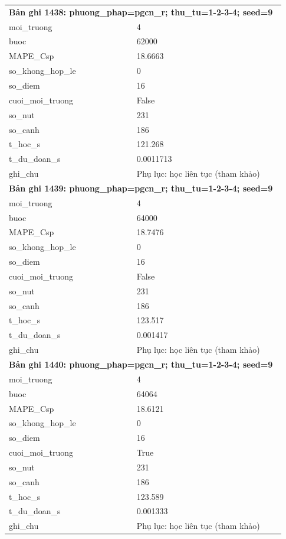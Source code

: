 \begin{longtable}{p{0.43\linewidth}p{0.50\linewidth}}
\midrule
\multicolumn{2}{p{0.95\linewidth}}{\textbf{Bản ghi 1438: phuong\_phap=pgcn\_r; thu\_tu=1-2-3-4; seed=9}} \\
moi\_\allowbreak truong & 4 \\
buoc & 62000 \\
MAPE\_\allowbreak Csp & 18.6663 \\
so\_\allowbreak khong\_\allowbreak hop\_\allowbreak le & 0 \\
so\_\allowbreak diem & 16 \\
cuoi\_\allowbreak moi\_\allowbreak truong & False \\
so\_\allowbreak nut & 231 \\
so\_\allowbreak canh & 186 \\
t\_\allowbreak hoc\_\allowbreak s & 121.268 \\
t\_\allowbreak du\_\allowbreak doan\_\allowbreak s & 0.0011713 \\
ghi\_\allowbreak chu & Phụ lục: học liên tục (tham khảo) \\
\midrule
\multicolumn{2}{p{0.95\linewidth}}{\textbf{Bản ghi 1439: phuong\_phap=pgcn\_r; thu\_tu=1-2-3-4; seed=9}} \\
moi\_\allowbreak truong & 4 \\
buoc & 64000 \\
MAPE\_\allowbreak Csp & 18.7476 \\
so\_\allowbreak khong\_\allowbreak hop\_\allowbreak le & 0 \\
so\_\allowbreak diem & 16 \\
cuoi\_\allowbreak moi\_\allowbreak truong & False \\
so\_\allowbreak nut & 231 \\
so\_\allowbreak canh & 186 \\
t\_\allowbreak hoc\_\allowbreak s & 123.517 \\
t\_\allowbreak du\_\allowbreak doan\_\allowbreak s & 0.001417 \\
ghi\_\allowbreak chu & Phụ lục: học liên tục (tham khảo) \\
\midrule
\multicolumn{2}{p{0.95\linewidth}}{\textbf{Bản ghi 1440: phuong\_phap=pgcn\_r; thu\_tu=1-2-3-4; seed=9}} \\
moi\_\allowbreak truong & 4 \\
buoc & 64064 \\
MAPE\_\allowbreak Csp & 18.6121 \\
so\_\allowbreak khong\_\allowbreak hop\_\allowbreak le & 0 \\
so\_\allowbreak diem & 16 \\
cuoi\_\allowbreak moi\_\allowbreak truong & True \\
so\_\allowbreak nut & 231 \\
so\_\allowbreak canh & 186 \\
t\_\allowbreak hoc\_\allowbreak s & 123.589 \\
t\_\allowbreak du\_\allowbreak doan\_\allowbreak s & 0.001333 \\
ghi\_\allowbreak chu & Phụ lục: học liên tục (tham khảo) \\
\midrule
\bottomrule
\end{longtable}

